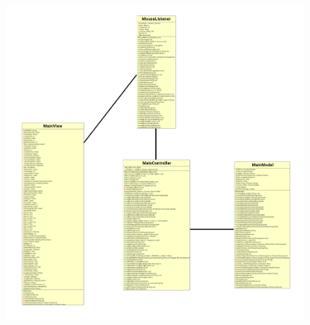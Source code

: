 \documentclass[12pt]{report}
\begin{document}
\begin{figure}[h]
	\centering
	\includegraphics[height=18cm]{images/mvc_dc}
\end{figure}
\end{document}
